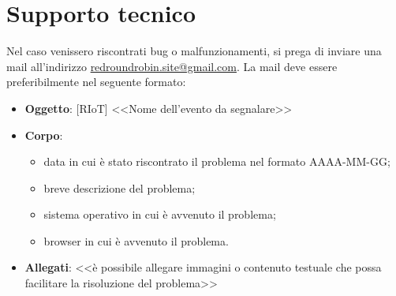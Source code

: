 \section{Supporto tecnico}
Nel caso venissero riscontrati bug o malfunzionamenti, si prega di inviare una mail all'indirizzo \href{mailto:redroundrobin.site@gmail.com}{redroundrobin.site@gmail.com}. La mail deve essere preferibilmente nel seguente formato:
\begin{itemize}
 	\item \textbf{Oggetto}: [RIoT] <<Nome dell'evento da segnalare>> 
 	\item \textbf{Corpo}: 
 		\begin{itemize}
 			\item data in cui è stato riscontrato il problema nel formato AAAA-MM-GG;
 			\item breve descrizione del problema;
 			\item sistema operativo in cui è avvenuto il problema;
 			\item browser in cui è avvenuto il problema.
 		\end{itemize}
 	\item \textbf{Allegati}: <<è possibile allegare immagini o contenuto testuale che possa facilitare la risoluzione del problema>>	
 \end{itemize} 